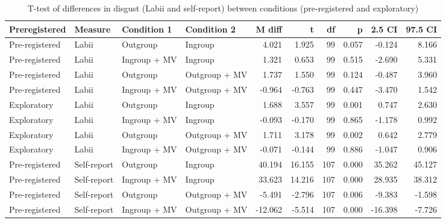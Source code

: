 \begin{table}[ht]
\centering
\caption{T-test of differences in disgust (Labii and self-report) between conditions (pre-registered and exploratory)} 
\label{tab:prereg_ttest_conditions}
\begingroup\fontsize{8pt}{10pt}\selectfont
\begin{tabular}{llllrrrrrr}
  \hline
Preregistered & Measure & Condition 1 & Condition 2 & M diff & t & df & p & 2.5 CI & 97.5 CI \\ 
  \hline
Pre-registered & Labii & Outgroup & Ingroup & 4.021 & 1.925 & 99 & 0.057 & -0.124 & 8.166 \\ 
  Pre-registered & Labii & Ingroup + MV & Ingroup & 1.321 & 0.653 & 99 & 0.515 & -2.690 & 5.331 \\ 
  Pre-registered & Labii & Outgroup & Outgroup + MV & 1.737 & 1.550 & 99 & 0.124 & -0.487 & 3.960 \\ 
  Pre-registered & Labii & Ingroup + MV & Outgroup + MV & -0.964 & -0.763 & 99 & 0.447 & -3.470 & 1.542 \\ 
  Exploratory & Labii & Outgroup & Ingroup & 1.688 & 3.557 & 99 & 0.001 & 0.747 & 2.630 \\ 
  Exploratory & Labii & Ingroup + MV & Ingroup & -0.093 & -0.170 & 99 & 0.865 & -1.178 & 0.992 \\ 
  Exploratory & Labii & Outgroup & Outgroup + MV & 1.711 & 3.178 & 99 & 0.002 & 0.642 & 2.779 \\ 
  Exploratory & Labii & Ingroup + MV & Outgroup + MV & -0.071 & -0.144 & 99 & 0.886 & -1.047 & 0.906 \\ 
  Pre-registered & Self-report & Outgroup & Ingroup & 40.194 & 16.155 & 107 & 0.000 & 35.262 & 45.127 \\ 
  Pre-registered & Self-report & Ingroup + MV & Ingroup & 33.623 & 14.216 & 107 & 0.000 & 28.935 & 38.312 \\ 
  Pre-registered & Self-report & Outgroup & Outgroup + MV & -5.491 & -2.796 & 107 & 0.006 & -9.383 & -1.598 \\ 
  Pre-registered & Self-report & Ingroup + MV & Outgroup + MV & -12.062 & -5.514 & 107 & 0.000 & -16.398 & -7.726 \\ 
   \hline
\end{tabular}
\endgroup
\end{table}

